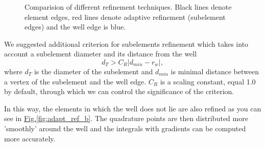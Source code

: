 \documentclass[preprint,12pt,authoryear]{elsarticle}
\newcommand{\fig}[1]{\hyperref[#1]{Fig.\ref{#1}}}
\begin{document}
\begin{figure}[!htb]
  \centering    
  \hspace{0pt}
  \caption[Adaptive refinement comparision]
  {Comparision of different refinement techniques.
   Black lines denote element edges, red lines denote adaptive refinement (subelement edges) and the well
   edge is blue.
  }
  \label{fig:adapt_refinement}
\end{figure}

We suggested additional criterion for subelements refinement which takes into account a subelement diameter 
and its distance from the well
\begin{equation}
  d_T > C_R|d_{min} - r_w|,
\end{equation}
where $d_T$ is the diameter of the subelement and $d_{min}$ is minimal distance between a vertex of 
the subelement and the well edge. $C_R$ is a scaling constant, equal 1.0 by default, through which we can 
control the significance of the criterion.

In this way, the elements in which the well does not lie are also refined as you can see in 
\fig{fig:adapt_ref_b}. The quadrature points are then distributed more 'smoothly' around the well and the
integrals with gradients can be computed more accurately. 
\end{document}
